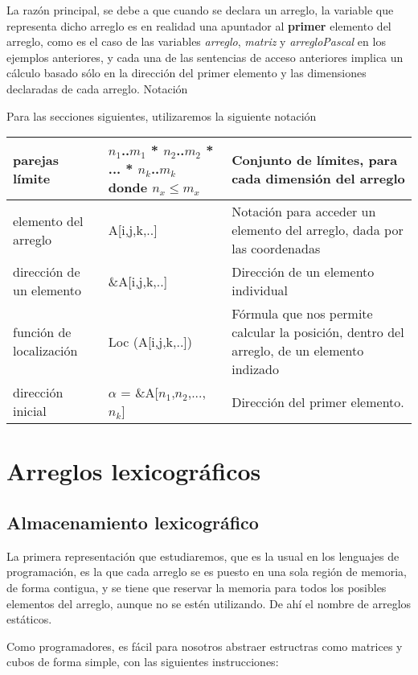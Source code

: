 La razón principal, se debe a que cuando se declara un arreglo, la
variable que representa dicho arreglo es en realidad una apuntador al
\textbf{primer} elemento del arreglo, como es el caso de las variables
\textit{arreglo}, \textit{matriz} y \textit{arregloPascal} en los
ejemplos anteriores, y cada una de las sentencias de acceso anteriores
implica un cálculo basado sólo en la dirección del primer elemento y
las dimensiones declaradas de cada arreglo.  Notación

Para las secciones siguientes, utilizaremos la siguiente notación
\begin{table}[H]
  \centering
  \begin{tabular}{lp{4cm}p{4cm}}
    \hline
    parejas límite & $n_1$..$m_1$ * $n_2$..$m_2$ * ... * $n_k$..$m_k$ donde $n_x \leq m_x$ &Conjunto de límites, para cada dimensión del arreglo\\
    \hline
    elemento del arreglo & A[i,j,k,..]& Notación para acceder un elemento del arreglo, dada por las coordenadas\\
    \hline
    dirección de un elemento &\&A[i,j,k,..]&Dirección de un elemento individual\\
    \hline
    función de localización &  Loc (A[i,j,k,..])& Fórmula que nos permite calcular la posición, dentro del arreglo, de un elemento indizado\\
    \hline
    dirección inicial& $\alpha$ = \&A[$n_1$,$n_2$,...,$n_k$]& Dirección del primer elemento.\\
    \hline
  \end{tabular}
\end{table}

\section{ Arreglos lexicográficos }
\subsection{Almacenamiento lexicográfico}
La primera representación que estudiaremos, que es la usual en los
lenguajes de programación, es la que cada arreglo se es puesto en una
sola región de memoria, de forma contigua, y se tiene que reservar la
memoria para todos los posibles elementos del arreglo, aunque no se
estén utilizando.  De ahí el nombre de arreglos estáticos.

Como programadores, es fácil para nosotros abstraer estructras como
matrices y cubos de forma simple, con las siguientes instrucciones:

